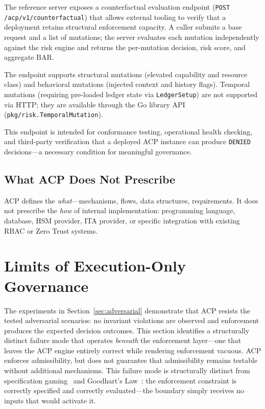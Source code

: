 \documentclass[11pt]{article}
\theoremstyle{definition}
\begin{document}
The reference server exposes a counterfactual evaluation endpoint
(\texttt{POST /acp/v1/counterfactual}) that allows external tooling to verify
that a deployment retains structural enforcement capacity.
A caller submits a base request and a list of mutations; the server evaluates
each mutation independently against the risk engine and returns the per-mutation
decision, risk score, and aggregate BAR.

The endpoint supports structural mutations (elevated capability and resource class)
and behavioral mutations (injected context and history flags).
Temporal mutations (requiring pre-loaded ledger state via \texttt{LedgerSetup})
are not supported via HTTP; they are available through the Go library API
(\texttt{pkg/risk.TemporalMutation}).

This endpoint is intended for conformance testing, operational health checking,
and third-party verification that a deployed ACP instance can produce
\texttt{DENIED} decisions---a necessary condition for meaningful governance.

\subsection{What ACP Does Not Prescribe}

ACP defines the \emph{what}---mechanisms, flows, data structures, requirements.
It does not prescribe the \emph{how} of internal implementation:
programming language, database, HSM provider, ITA provider,
or specific integration with existing RBAC or Zero Trust systems.

\section{Limits of Execution-Only Governance}
\label{sec:deviation-collapse}

The experiments in Section~\ref{sec:adversarial} demonstrate that ACP
resists the tested adversarial scenarios: no invariant violations are observed and
enforcement produces the expected decision outcomes.
This section identifies a structurally distinct failure mode that operates
\emph{beneath} the enforcement layer---one that leaves the ACP engine entirely
correct while rendering enforcement vacuous.
ACP enforces admissibility, but does not guarantee that admissibility remains
testable without additional mechanisms.
This failure mode is structurally distinct from specification
gaming~\cite{krakovna2020specification} and Goodhart's
Law~\cite{goodhart1975monetary,strathern1997improving}: the enforcement
constraint is correctly specified and correctly evaluated---the boundary simply
receives no inputs that would activate it.
\end{document}
